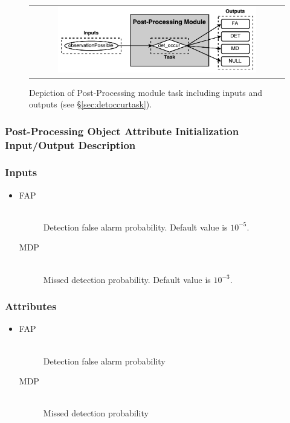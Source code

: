 \documentclass[cleanfoot]{asme2ej}
\begin{document}
\begin{figure}[ht]
    \begin{center}
        \begin{tabular}{c}
             \includegraphics[width=0.8\textwidth]{PostTasks}
        \end{tabular}
    \end{center}
    \caption{\label{fig:postprocessingmodule} Depiction of Post-Processing module task including inputs and outputs (see \S\ref{sec:detoccurtask}).}
\end{figure}

\subsubsection{Post-Processing Object Attribute Initialization Input/Output Description}
\subsubsection*{Inputs}
\begin{itemize}
    \item 
    \begin{description}
          \item[FAP] \hfill \\
            Detection false alarm probability. Default value is $10^{-5}$.
            \item[MDP] \hfill \\
            Missed detection probability. Default value is $10^{-3}$.
        \end{description}
\end{itemize}

\subsubsection*{Attributes}
\begin{itemize}
    \item 
    \begin{description}
        \item[FAP] \hfill \\
        Detection false alarm probability
        \item[MDP] \hfill \\
        Missed detection probability
    \end{description}
\end{itemize}
\end{document}
